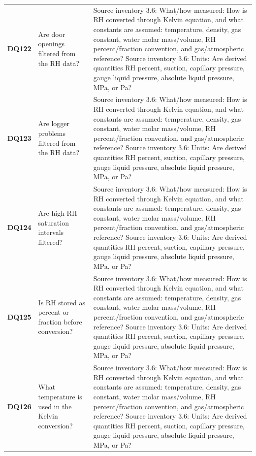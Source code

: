 \begin{longtable}{@{}L{0.09\textwidth} L{0.31\textwidth} L{0.52\textwidth}@{}}
\addlinespace[0.18em]
\textbf{DQ122} & Are door openings filtered from the RH data? & Source inventory 3.6: What/how measured: How is RH converted through Kelvin equation, and what constants are assumed: temperature, density, gas constant, water molar mass/volume, RH percent/fraction convention, and gas/atmospheric reference? Source inventory 3.6: Units: Are derived quantities RH percent, suction, capillary pressure, gauge liquid pressure, absolute liquid pressure, MPa, or Pa?\\
\addlinespace[0.18em]
\textbf{DQ123} & Are logger problems filtered from the RH data? & Source inventory 3.6: What/how measured: How is RH converted through Kelvin equation, and what constants are assumed: temperature, density, gas constant, water molar mass/volume, RH percent/fraction convention, and gas/atmospheric reference? Source inventory 3.6: Units: Are derived quantities RH percent, suction, capillary pressure, gauge liquid pressure, absolute liquid pressure, MPa, or Pa?\\
\addlinespace[0.18em]
\textbf{DQ124} & Are high-RH saturation intervals filtered? & Source inventory 3.6: What/how measured: How is RH converted through Kelvin equation, and what constants are assumed: temperature, density, gas constant, water molar mass/volume, RH percent/fraction convention, and gas/atmospheric reference? Source inventory 3.6: Units: Are derived quantities RH percent, suction, capillary pressure, gauge liquid pressure, absolute liquid pressure, MPa, or Pa?\\
\addlinespace[0.18em]
\textbf{DQ125} & Is RH stored as percent or fraction before conversion? & Source inventory 3.6: What/how measured: How is RH converted through Kelvin equation, and what constants are assumed: temperature, density, gas constant, water molar mass/volume, RH percent/fraction convention, and gas/atmospheric reference? Source inventory 3.6: Units: Are derived quantities RH percent, suction, capillary pressure, gauge liquid pressure, absolute liquid pressure, MPa, or Pa?\\
\addlinespace[0.18em]
\textbf{DQ126} & What temperature is used in the Kelvin conversion? & Source inventory 3.6: What/how measured: How is RH converted through Kelvin equation, and what constants are assumed: temperature, density, gas constant, water molar mass/volume, RH percent/fraction convention, and gas/atmospheric reference? Source inventory 3.6: Units: Are derived quantities RH percent, suction, capillary pressure, gauge liquid pressure, absolute liquid pressure, MPa, or Pa?\\

\end{longtable}
